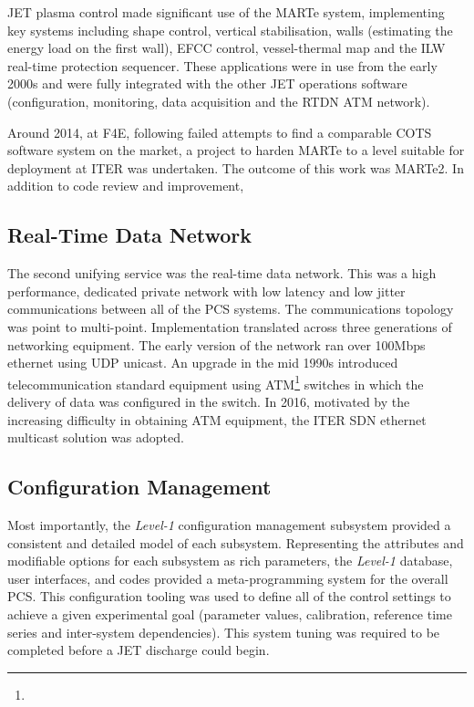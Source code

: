 \documentclass[5p]{elsarticle}
\begin{document}
JET plasma control made significant use of the MARTe system, implementing key systems
including shape control, vertical stabilisation, walls (estimating the energy load on the first wall),
EFCC control, vessel-thermal map and the ILW real-time protection sequencer.  These applications
were in use from the early 2000s and were fully integrated with the other JET operations software
(configuration, monitoring, data acquisition and the RTDN ATM network).

Around 2014, at F4E, following failed attempts to find a comparable COTS software system 
on the market, a project to harden MARTe to a level suitable for deployment at ITER 
was undertaken.  The outcome of this work was MARTe2.  In addition to code review and improvement,


\subsection{Real-Time Data Network}

The second unifying service was the real-time data network. This was a high performance, dedicated private network with low latency and low jitter communications between all of the PCS systems.  The communications topology was point to multi-point. Implementation translated across three generations of networking equipment.  The early version of the network ran over 100Mbps ethernet using UDP unicast. An upgrade in the mid 1990s introduced telecommunication standard equipment using ATM\footnote{} switches in which the delivery of data was configured in the switch. In 2016, motivated by the increasing difficulty in obtaining ATM equipment, the ITER SDN ethernet multicast solution was adopted.

\subsection{Configuration Management}

  Most importantly, the {\em Level-1} configuration management subsystem provided a consistent and detailed model of each subsystem. Representing the attributes and modifiable options for each subsystem as rich parameters, the {\em Level-1} database, user interfaces, and codes provided a meta-programming system for the overall PCS.  This configuration tooling was
used to define all of the control settings to achieve a given experimental goal (parameter values, calibration, reference time series and inter-system dependencies).  This system tuning was required to be completed before a JET discharge could begin.  
\end{document}
